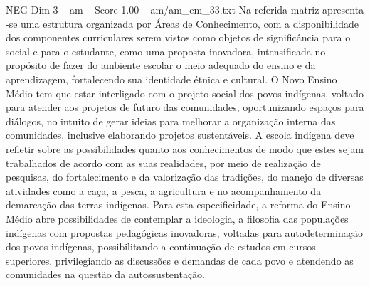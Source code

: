 \begin{textsample}{NEG Dim 3 – am – Score 1.00 – am/am\_em\_33.txt}
Na referida matriz apresenta -se uma estrutura organizada por Áreas de Conhecimento, com a disponibilidade dos componentes curriculares serem vistos como objetos de significância para o social e para o estudante, como uma proposta inovadora, intensificada no propósito de fazer do ambiente escolar o meio adequado do ensino e da aprendizagem, fortalecendo sua identidade étnica e cultural.
O Novo Ensino Médio tem que estar interligado com o projeto social dos povos indígenas, voltado para atender aos projetos de futuro das comunidades, oportunizando espaços para diálogos, no intuito de gerar ideias para melhorar a organização interna das comunidades, inclusive elaborando projetos sustentáveis.
A escola indígena deve refletir sobre as possibilidades quanto aos conhecimentos de modo que estes sejam trabalhados de acordo com as suas realidades, por meio de realização de pesquisas, do fortalecimento e da valorização das tradições, do manejo de diversas atividades como a caça, a pesca, a agricultura e no acompanhamento da demarcação das terras indígenas.
Para esta especificidade, a reforma do Ensino Médio abre possibilidades de contemplar a ideologia, a filosofia das populações indígenas com propostas pedagógicas inovadoras, voltadas para autodeterminação dos povos indígenas, possibilitando a continuação de estudos em cursos superiores, privilegiando as discussões e demandas de cada povo e atendendo as comunidades na questão da autossustentação.

\end{textsample}
